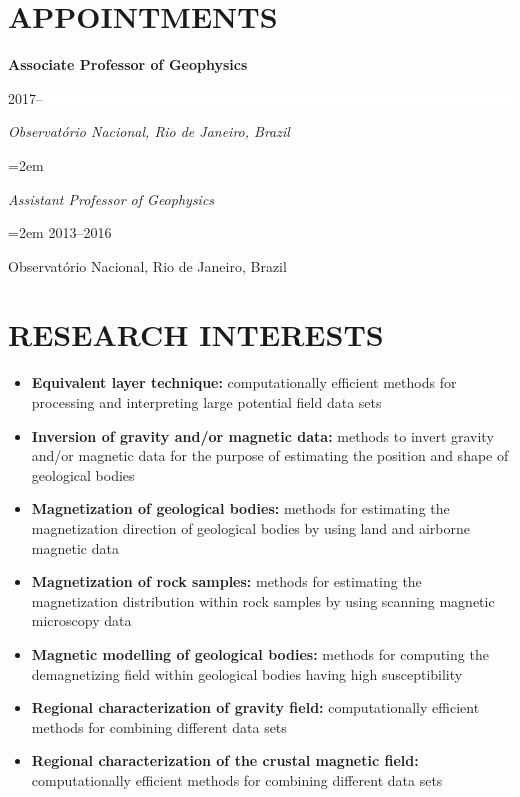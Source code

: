 \documentclass[paper=letter,fontsize=11pt]{scrartcl} %
\newcommand{\sepspace}{\vspace*{1em}}		%
\newcommand{\NewPart}[2]{\section*{\uppercase{#1} #2}}
\newcommand{\EducationEntry}[4]{
		\noindent \textbf{#1} \hfill      %
		\colorbox{White}{%
			\parbox{10em}{%
			\hfill\color{Black}#2}} \par  %
		\noindent \textit{#3} \par        %
		\noindent\hangindent=2em\hangafter=0 \small #4 %
		\normalsize \par}
\begin{document}
\NewPart{Appointments}{}



\EducationEntry{Associate Professor of Geophysics}{2017--}
{Observat\'{o}rio Nacional, Rio de Janeiro, Brazil}

\EducationEntry{Assistant Professor of Geophysics}{2013--2016}
{Observat\'{o}rio Nacional, Rio de Janeiro, Brazil}

\sepspace

\NewPart{Research interests}{}

{\begin{itemize}

\item{\textbf{Equivalent layer technique:} computationally efficient methods for processing and interpreting large potential field data sets}

\item{\textbf{Inversion of gravity and/or magnetic data:} methods to invert gravity and/or magnetic data for the purpose of estimating the position and shape of geological bodies}

\item{\textbf{Magnetization of geological bodies:} methods for estimating the magnetization direction of geological bodies by using land and airborne magnetic data}

\item{\textbf{Magnetization of rock samples:} methods for estimating the magnetization distribution within rock samples by using scanning magnetic microscopy data}

\item{\textbf{Magnetic modelling of geological bodies:} methods for computing the demagnetizing field within geological bodies having high susceptibility}

\item{\textbf{Regional characterization of gravity field:} computationally efficient methods for combining different data sets}

\item{\textbf{Regional characterization of the crustal magnetic field:} computationally efficient methods for combining different data sets}

\end{itemize}}
\end{document}
